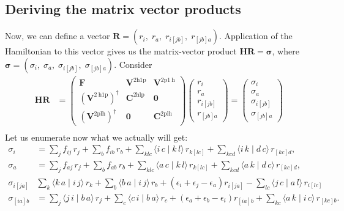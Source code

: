 \subsection{Deriving the matrix vector products}
Now, we can define a vector $\bm{R} = ( r_i,\; r_a,\; r_{i[jb]},\; r_{[jb]a} )$. Application of the Hamiltonian to this vector gives us the matrix-vector product $\bm{H} \bm{R} = \bm{\sigma }$, where $\bm{\sigma} = ( \sigma_i,\; \sigma_a,\; \sigma_{i[jb]},\; \sigma_{[jb]a} )$. Consider
\begin{align}
\bm{H} \bm{R} &= \begin{pmatrix} \bm{F} & \bm{V}^{2 \mathrm{h1p}} & \bm{V}^{2 \mathrm{p} 1 \mathrm{~h}} \\ \left(\bm{V}^{2 \mathrm{~h} 1 \mathrm{p}}\right)^{\dagger} & \bm{C}^{2 \mathrm{hlp}} & \bm{0} \\ \left(\bm{V}^{2 \mathrm{plh}}\right)^{\dagger} & \bm{0} & \bm{C}^{2 \mathrm{plh}} \end{pmatrix} \begin{pmatrix} r_i \\ r_a \\ r_{i[jb]} \\ r_{[jb]a} \end{pmatrix} = \begin{pmatrix} \sigma_i \\ \sigma_a \\ \sigma_{i[jb]} \\ \sigma_{[jb]a} \end{pmatrix} \\[6pt]
\end{align}
Let us enumerate now what we actually will get:
\begin{align}
\sigma_i &= 
  \sum_{j} f_{i j}\,r_j
  + \sum_{b} f_{i b}\,r_b
  + \sum_{k l c} \bigl\langle i\,c \mid k\,l \bigr\rangle\,r_{k[l c]}
  + \sum_{k c d} \bigl\langle i\,k \mid d\,c \bigr\rangle\,r_{[k c]d}, \\[6pt]
\sigma_a &=
    \sum_{j} f_{a j}\,r_j
    + \sum_{b} f_{a b}\,r_b
    + \sum_{k l c} \bigl\langle a\,c \mid k\,l \bigr\rangle\,r_{k[l c]}
    + \sum_{k c d} \bigl\langle a\,k \mid d\,c \bigr\rangle\,r_{[k c]d}, \\[6pt]
\sigma_{i[ja]} &
    \sum_{k} \bigl\langle k\,a \mid i\,j \bigr\rangle\,r_k
    + \sum_{b} \bigl\langle b\,a \mid i\,j \bigr\rangle\,r_b
    + \left(\epsilon _{i} + \epsilon _{j} - \epsilon _{a}\right) r_{i[j a]}
    - \sum_{lc} \bigl\langle j\,c \mid a\,l \bigr\rangle\,r_{i[l c]} \\[6pt]
\sigma_{[ia]b} &= 
    \sum_{j} \bigl\langle j\,i \mid b\,a \bigr\rangle\,r_j
    + \sum_{c} \bigl\langle c\,i \mid b\,a \bigr\rangle\,r_c
    + \left(\epsilon _{a} + \epsilon _{b} - \epsilon _{i}\right) r_{[i a] b}
    + \sum_{k c} \bigl\langle a\,k \mid i\,c \bigr\rangle\,r_{[k c] b}.
\end{align}
